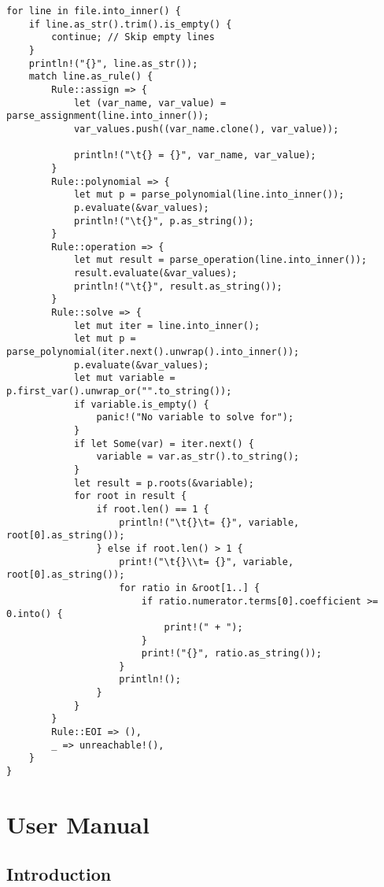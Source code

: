 \begin{lstlisting}[caption={Iterating through the lines of the input file}, label={lst:iterating-input}]
    for line in file.into_inner() {
    if line.as_str().trim().is_empty() {
        continue; // Skip empty lines
    }
    println!("{}", line.as_str());
    match line.as_rule() {
        Rule::assign => {
            let (var_name, var_value) = parse_assignment(line.into_inner());
            var_values.push((var_name.clone(), var_value));

            println!("\t{} = {}", var_name, var_value);
        }
        Rule::polynomial => {
            let mut p = parse_polynomial(line.into_inner());
            p.evaluate(&var_values);
            println!("\t{}", p.as_string());
        }
        Rule::operation => {
            let mut result = parse_operation(line.into_inner());
            result.evaluate(&var_values);
            println!("\t{}", result.as_string());
        }
        Rule::solve => {
            let mut iter = line.into_inner();
            let mut p = parse_polynomial(iter.next().unwrap().into_inner());
            p.evaluate(&var_values);
            let mut variable = p.first_var().unwrap_or("".to_string());
            if variable.is_empty() {
                panic!("No variable to solve for");
            }
            if let Some(var) = iter.next() {
                variable = var.as_str().to_string();
            }
            let result = p.roots(&variable);
            for root in result {
                if root.len() == 1 {
                    println!("\t{}\t= {}", variable, root[0].as_string());
                } else if root.len() > 1 {
                    print!("\t{}\\t= {}", variable, root[0].as_string());
                    for ratio in &root[1..] {
                        if ratio.numerator.terms[0].coefficient >= 0.into() {
                            print!(" + ");
                        }
                        print!("{}", ratio.as_string());
                    }
                    println!();
                }
            }
        }
        Rule::EOI => (),
        _ => unreachable!(),
    }
}
\end{lstlisting}

\chapter{User Manual}\label{chap:user-manual}

\section{Introduction}

